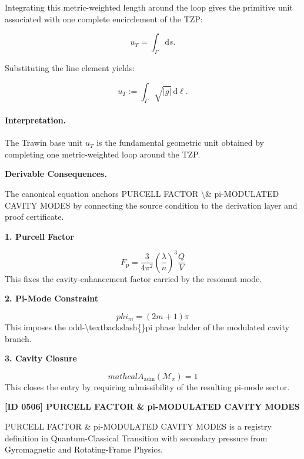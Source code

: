 Integrating this metric-weighted length around the loop gives the primitive unit associated with one complete encirclement of the TZP:

\begin{equation}
u_T = \int_{\Gamma}\mathrm{d}s .
\end{equation}

Substituting the line element yields:

\begin{equation}
\boxed{
u_T := \int_{\Gamma}\sqrt{|g|}\,\mathrm{d}\ell .
}
\end{equation}

\paragraph{Interpretation.}
The Trawin base unit $u_T$ is the fundamental geometric unit obtained by completing one metric-weighted loop around the TZP.

\par\vspace{0.35em}
\noindent\textbf{Derivable Consequences.}\quad
\begingroup
\footnotesize
\raggedright
The canonical equation anchors PURCELL FACTOR \textbackslash{}\& pi-MODULATED CAVITY MODES by connecting the source condition to the derivation layer and proof certificate.
\par\endgroup

\noindent\textbf{1. Purcell Factor}\par
\[
F_{\mathrm{p}} = \frac{3}{4\pi^2}\left(\frac{\lambda}{n}\right)^3 \frac{Q}{V}
\]
\noindent This fixes the cavity-enhancement factor carried by the resonant mode.\par
\noindent\textbf{2. Pi-Mode Constraint}\par
\[
phi_m = (2m+1)\pi
\]
\noindent This imposes the odd-\textbackslash{}textbackslash\{\}pi phase ladder of the modulated cavity branch.\par
\noindent\textbf{3. Cavity Closure}\par
\[
mathcal{A}_{\mathrm{adm}}\!\left(\mathcal{M}_{\pi}\right)=1
\]
\noindent This closes the entry by requiring admissibility of the resulting pi-mode sector.\par

\clearpage
\noindent\textbf{[ID 0506] PURCELL FACTOR \& pi-MODULATED CAVITY MODES}\par
\vspace{0.35em}
\begingroup\small
{}
PURCELL FACTOR \& pi-MODULATED CAVITY MODES is a registry definition in Quantum-Classical Transition with secondary pressure from Gyromagnetic and Rotating-Frame Physics.


